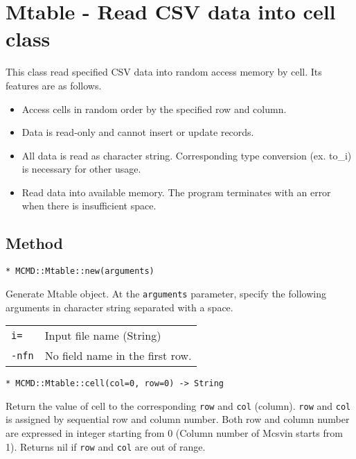 
%

\section{Mtable - Read CSV data into cell class \label{sect:mtableRB}}
This class read specified CSV data into random access memory by cell. 
Its features are as follows. 

\begin{itemize}
\item Access cells in random order by the specified row and column.
\item Data is read-only and cannot insert or update records. 
\item All data is read as character string. Corresponding type conversion (ex. to\_i) is necessary for other usage. 
\item Read data into available memory. The program terminates with an error when there is insufficient space.
\end{itemize} 

\subsection{Method}

{\Large
\begin{verbatim}
* MCMD::Mtable::new(arguments)
\end{verbatim}
}

Generate Mtable object. 
At the \verb|arguments| parameter, specify the following arguments in character string separated with a space.

\begin{table}[htbp]
\begin{tabular}{ll}
\verb|i=|    & Input file name (String)\\
\verb|-nfn|  & No field name in the first row. \\
\end{tabular} 
\end{table} 

{\Large
\begin{verbatim}
* MCMD::Mtable::cell(col=0, row=0) -> String
\end{verbatim}
}

Return the value of cell to the corresponding \verb|row| and \verb|col| (column). 
\verb|row| and \verb|col| is assigned by sequential row and column number. 
Both row and column number are expressed in integer starting from 0 (Column number of Mcsvin starts from 1). Returns nil if \verb|row| and \verb|col| are out of range.


